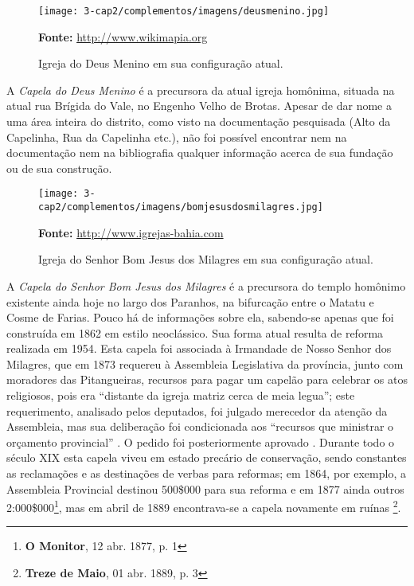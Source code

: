 \begin{figure}[!htp]
\caption{Igreja do Deus Menino em sua configuração atual.}
\centering
\texttt{[image: 3-cap2/complementos/imagens/deusmenino.jpg]}{\footnotesize \par \textbf{Fonte:} \url{http://www.wikimapia.org} \par}
\end{figure}

A \textit{Capela do Deus Menino} é a precursora da atual igreja homônima, situada na atual rua Brígida do Vale, no Engenho Velho de Brotas. Apesar de dar nome a uma área inteira do distrito, como visto na documentação pesquisada (Alto da Capelinha, Rua da Capelinha etc.), não foi possível encontrar nem na documentação nem na bibliografia qualquer informação acerca de sua fundação ou de sua construção.  

\begin{figure}[!htp]
\centering
\caption{Igreja do Senhor Bom Jesus dos Milagres em sua configuração atual.}
\texttt{[image: 3-cap2/complementos/imagens/bomjesusdosmilagres.jpg]}{\footnotesize \par \textbf{Fonte:} \url{http://www.igrejas-bahia.com} \par}
\end{figure}

A \textit{Capela do Senhor Bom Jesus dos Milagres} é a precursora do templo homônimo existente ainda hoje no largo dos Paranhos, na bifurcação entre o Matatu e Cosme de Farias. Pouco há de informações sobre ela, sabendo-se apenas que foi construída em 1862 \cite[p.~251]{VASCONCELOS2002} em estilo neoclássico. Sua forma atual resulta de reforma realizada em 1954. Esta capela foi associada à Irmandade de Nosso Senhor dos Milagres, que em 1873 requereu à Assembleia Legislativa da província, junto com moradores das Pitangueiras, recursos para pagar um capelão para celebrar os atos religiosos, pois era ``distante da igreja matriz cerca de meia legua''; este requerimento, analisado pelos deputados, foi julgado merecedor da atenção da Assembleia, mas sua deliberação foi condicionada aos ``recursos que ministrar o orçamento provincial'' \cite[p.~46]{bahia_relatassleg_1873}. O pedido foi posteriormente aprovado \cite[p.~53]{bahia_relatassleg_1873}. Durante todo o século XIX esta capela viveu em estado precário de conservação, sendo constantes as reclamações e as destinações de verbas para reformas; em 1864, por exemplo, a Assembleia Provincial destinou 500\$000 para sua reforma\cite[anexo~2, p.~2]{silvagomes_relatorio_1864} e em 1877 ainda outros 2:000\$000\footnote{\textbf{O Monitor}, 12 abr. 1877, p. 1}, mas em abril de 1889 encontrava-se a capela novamente em ruínas \footnote{\textbf{Treze de Maio}, 01 abr. 1889, p. 3}. 

